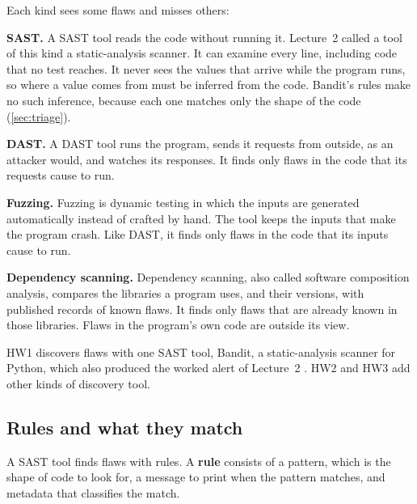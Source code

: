 Each kind sees some flaws and misses others:
\bi
\item \textbf{SAST.} A SAST tool reads the code without running it. Lecture~2 called a tool of this
kind a static-analysis scanner. It can examine every line, including code that no test reaches. It
never sees the values that arrive while the program runs, so where a value comes from must be
inferred from the code. Bandit's rules make no such inference, because each one matches only the
shape of the code (\cref{sec:triage}).
\item \textbf{DAST.} A DAST tool runs the program, sends it requests from outside, as an attacker
would, and watches its responses. It finds only flaws in the code that its requests cause to run.
\item \textbf{Fuzzing.} Fuzzing is dynamic testing in which the inputs are generated
automatically instead of crafted by hand. The tool keeps the inputs that make the program crash.
Like DAST, it finds only flaws in the code that its inputs cause to run.
\item \textbf{Dependency scanning.} Dependency scanning, also called software composition analysis,
compares the libraries a program uses, and their versions, with published records of known flaws.
It finds only flaws that are already known in those libraries. Flaws in the program's own code are
outside its view.
\ei

HW1 discovers flaws with one SAST tool, Bandit, a static-analysis scanner for Python, which also
produced the worked alert of Lecture~2 \citep{bandit}. HW2 and HW3 add other kinds of discovery
tool.

\subsection{Rules and what they match}
\label{sec:discovery-rules}

A SAST tool finds flaws with rules. A \textbf{rule} consists of a pattern, which is the shape of
code to look for, a message to print when the pattern matches, and metadata that classifies the
match.

